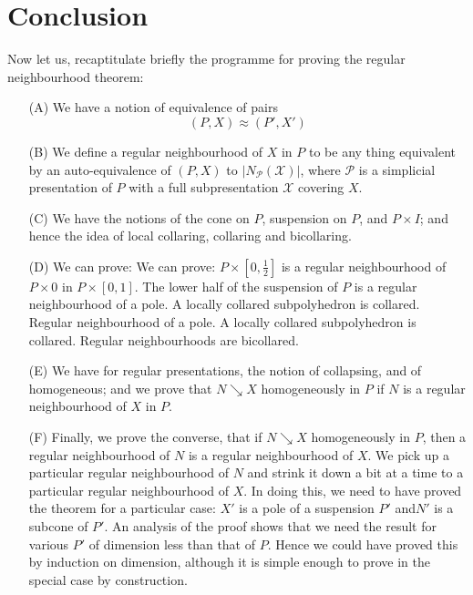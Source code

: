 \section{Conclusion}\pageoriginale\label{chap6-sec6.10}

Now let us, recaptitulate briefly the programme for proving the regular neighbourhood theorem:
\begin{itemize}
\item[(A)] We have a notion of equivalence of pairs
$$
(P,X)\approx (P',X')
$$

\item[(B)] We define a regular neighbourhood of $X$ in $P$ to be any thing equivalent by an auto-equivalence of $(P,X)$ to $|N_{\mathscr{P}}(\mathscr{X})|$, where $\mathscr{P}$ is a simplicial presentation of $P$ with a full subpresentation $\mathscr{X}$ covering $X$.

\item[(C)] We have the notions of the cone on $P$, suspension on $P$, and $P\times I$; and hence the idea of local collaring, collaring and bicollaring.

\item[(D)] We can prove: We can prove: $P\times[0,\frac{1}{2}]$ is a regular neighbourhood of $P\times 0$ in $P\times [0,1]$. The lower half of the suspension of $P$ is a regular neighbourhood of a pole. A locally collared subpolyhedron is collared. Regular neighbourhood of a pole. A locally collared subpolyhedron is collared. Regular neighbourhoods are bicollared. 

\item[(E)] We have for regular presentations, the notion of collapsing, and of homogeneous; and we prove that $N\searrow X$ homogeneously in $P$ if $N$ is a regular neighbourhood of $X$ in $P$.

\item[(F)] Finally, we prove the converse, that if $N\searrow X$ homogeneously in $P$, then a regular neighbourhood of $N$ is a regular neighbourhood of $X$. We pick up a particular regular neighbourhood of $N$ and strink it down a bit at a time to a particular regular neighbourhood of $X$. In doing this, we need to have proved the theorem for a particular case: $X'$ is a pole of a suspension $P'$ and\pageoriginale $N'$ is a subcone of $P'$. An analysis of the proof shows that we need the result for various $P'$ of dimension less than that of $P$. Hence we could have proved this by induction on dimension, although it is simple enough to prove in the special case by construction.
\end{itemize}

